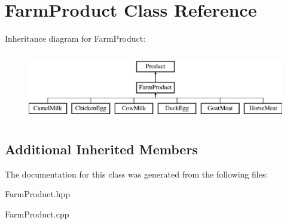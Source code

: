 \hypertarget{class_farm_product}{}\section{Farm\+Product Class Reference}
\label{class_farm_product}
Inheritance diagram for Farm\+Product\+:\begin{figure}[H]
\begin{center}
\leavevmode
\includegraphics[height=3.000000cm]{class_farm_product}
\end{center}
\end{figure}
\subsection*{Additional Inherited Members}


The documentation for this class was generated from the following files\+:\begin{DoxyCompactItemize}
\item 
Farm\+Product.\+hpp\item 
Farm\+Product.\+cpp\end{DoxyCompactItemize}
